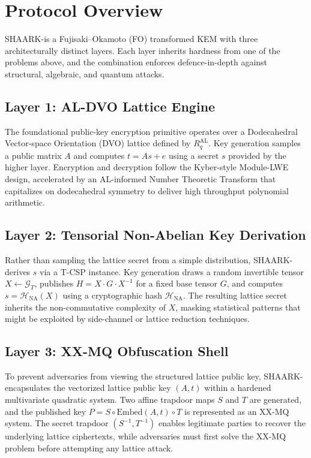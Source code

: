\documentclass[11pt]{article}
\begin{document}
\section{Protocol Overview}
SHAARK-\Xi is a Fujisaki--Okamoto (FO) transformed KEM with three architecturally distinct layers. Each layer inherits hardness from one of the problems above, and the combination enforces defence-in-depth against structural, algebraic, and quantum attacks.

\subsection{Layer 1: AL-DVO Lattice Engine}
The foundational public-key encryption primitive operates over a Dodecahedral Vector-space Orientation (DVO) lattice defined by $R^{\mathrm{AL}}_q$. Key generation samples a public matrix $A$ and computes $t = As + e$ using a secret $s$ provided by the higher layer. Encryption and decryption follow the Kyber-style Module-LWE design, accelerated by an AL-informed Number Theoretic Transform that capitalizes on dodecahedral symmetry to deliver high throughput polynomial arithmetic.

\subsection{Layer 2: Tensorial Non-Abelian Key Derivation}
Rather than sampling the lattice secret from a simple distribution, SHAARK-\Xi derives $s$ via a T-CSP instance. Key generation draws a random invertible tensor $X \leftarrow \mathcal{G}_T$, publishes $H = X \cdot G \cdot X^{-1}$ for a fixed base tensor $G$, and computes $s = \mathcal{H}_{\mathrm{NA}}(X)$ using a cryptographic hash $\mathcal{H}_{\mathrm{NA}}$. The resulting lattice secret inherits the non-commutative complexity of $X$, masking statistical patterns that might be exploited by side-channel or lattice reduction techniques.

\subsection{Layer 3: XX-MQ Obfuscation Shell}
To prevent adversaries from viewing the structured lattice public key, SHAARK-\Xi encapsulates the vectorized lattice public key $(A, t)$ within a hardened multivariate quadratic system. Two affine trapdoor maps $S$ and $T$ are generated, and the published key $P = S \circ \mathrm{Embed}(A, t) \circ T$ is represented as an XX-MQ system. The secret trapdoor $(S^{-1}, T^{-1})$ enables legitimate parties to recover the underlying lattice ciphertexts, while adversaries must first solve the XX-MQ problem before attempting any lattice attack.
\end{document}
